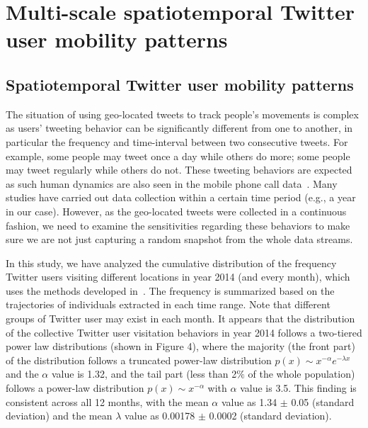 \documentclass[ijgi,article,submit,moreauthors,pdftex,10pt,a4paper]{mdpi}
\theoremstyle{mdpi}
\newcounter{ex}
\newcounter{re}
\theoremstyle{mdpidefinition}
\begin{document}
\section{Multi-scale spatiotemporal Twitter user mobility patterns}
\subsection{Spatiotemporal Twitter user mobility patterns}
The situation of using geo-located tweets to track people's movements is complex as users' tweeting behavior can be significantly different from one to another, in particular the frequency and time-interval between two consecutive tweets. For example, some people may tweet once a day while others do more; some people may tweet regularly while others do not.  
These tweeting behaviors are expected as such human dynamics are also seen in the mobile phone call data~\cite{gonzalez2008understanding}. 
Many studies have carried out data collection within a certain time period (e.g., a year in our case).
However, as the geo-located tweets were collected in a continuous fashion, we need to examine the sensitivities regarding these behaviors to make sure we are not just capturing a random snapshot from the whole data streams. 

In this study, we have analyzed the cumulative distribution of the frequency Twitter users visiting different locations in year 2014 (and every month), which uses the methods developed in~\cite{clauset2009power}. 
The frequency is summarized based on the trajectories of individuals extracted in each time range. Note that different groups of Twitter user may exist in each month. 
It appears that the distribution of the collective Twitter user visitation behaviors in year 2014 follows a two-tiered power law distributions (shown in Figure 4), where the majority (the front part) of the distribution follows a truncated power-law distribution $p(x)\sim x^{-\alpha}e^{-\lambda x}$ and the $\alpha$ value is 1.32, and the tail part (less than 2$\%$ of the whole population) follows a power-law distribution  $p(x)\sim x^{-\alpha}$ with $\alpha$ value is 3.5.
This finding is consistent across all 12 months, with the mean $\alpha$ value as 1.34 $ \pm$  0.05 (standard deviation) and the mean $\lambda$ value as 0.00178 $ \pm$  0.0002 (standard deviation). 
\end{document}
